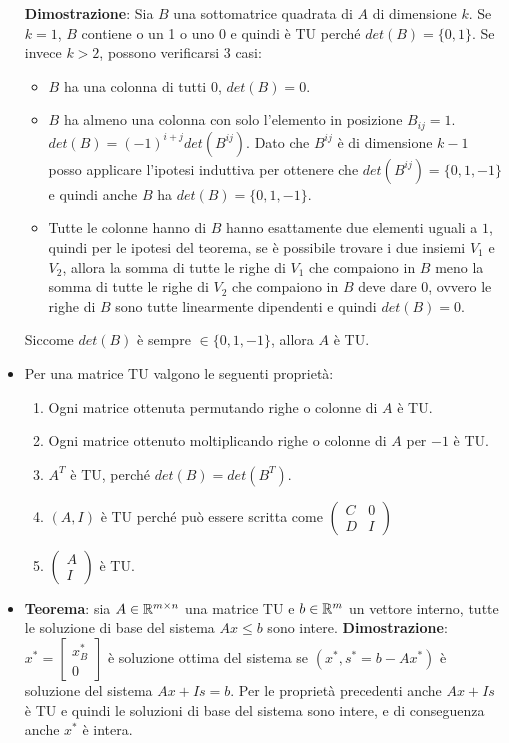 \begin{itemize}
	\textbf{Dimostrazione}: Sia $B$ una sottomatrice quadrata di $A$ di dimensione $k$. Se $k = 1$, $B$ contiene o un 1 o uno 0 e quindi è TU perché $det(B) = \{0,1\}$. Se invece $k > 2$, possono verificarsi 3 casi:
	\begin{itemize}
		\item $B$ ha una colonna di tutti 0, $det(B)=0$.
		\item $B$ ha almeno una colonna con solo l'elemento in posizione $B_{ij} = 1$. $det(B) = (-1)^{i+j}det(B^{ij})$. Dato che $B^{ij}$ è di dimensione $k-1$ posso applicare l'ipotesi induttiva per ottenere che $det(B^{ij}) = \{ 0,1,-1 \}$ e quindi anche $B$ ha $det(B) = \{0, 1, -1\}$.
		\item Tutte le colonne hanno di $B$ hanno esattamente due elementi uguali a $1$, quindi per le ipotesi del teorema, se è possibile trovare i due insiemi $V_1$ e $V_2$, allora la somma di tutte le righe di $V_1$ che compaiono in $B$ meno la somma di tutte le righe di $V_2$ che compaiono in $B$ deve dare 0, ovvero le righe di $B$ sono tutte linearmente dipendenti e quindi $det(B) = 0$.
	\end{itemize}
	Siccome $det(B)$ è sempre $\in \{0, 1, -1\}$, allora $A$ è TU.
	\item Per una matrice TU valgono le seguenti proprietà:
	\begin{enumerate}
		\item Ogni matrice ottenuta permutando righe o colonne di $A$ è TU.
		\item Ogni matrice ottenuto moltiplicando righe o colonne di $A$ per $-1$ è TU.
		\item $A^T$ è TU, perché $det(B) = det(B^T)$.
		\item $(A, I)$ è TU perché può essere scritta come $\begin{pmatrix}
		C & 0 \\
		D & I
		\end{pmatrix}$
		\item $\begin{pmatrix}
		A \\
		I
		\end{pmatrix}$ è TU.
	\end{enumerate}
	\item \textbf{Teorema}: sia $A \in \mathbb{R}^{m \times n}$ una matrice TU e $b \in \mathbb{R}^m$ un vettore interno, tutte le soluzione di base del sistema $Ax \leq b$ sono intere. \textbf{Dimostrazione}:  $x^* = \begin{bmatrix}
	x_{B}^* \\
	0
	\end{bmatrix}$ è soluzione ottima del sistema se $(x^*, s^* = b - Ax^*)$ è soluzione del sistema $Ax + Is = b$. Per le proprietà precedenti anche $Ax+Is$ è TU e quindi le soluzioni di base del sistema sono intere, e di conseguenza anche $x^*$ è intera.

\end{itemize}
